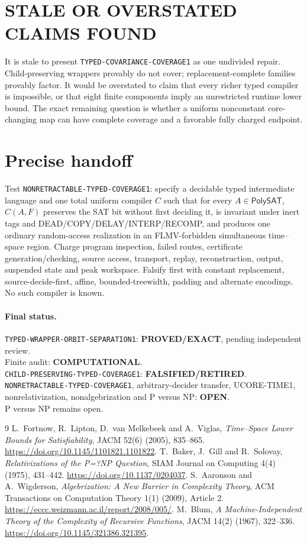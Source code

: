 \documentclass[11pt]{article}
\newcommand{\PolySAT}{\mathsf{PolySAT}}
\newcommand{\EXACT}{\textbf{PROVED/EXACT}}
\newcommand{\OPEN}{\textbf{OPEN}}
\newcommand{\RETIRED}{\textbf{FALSIFIED/RETIRED}}
\newcommand{\COMP}{\textbf{COMPUTATIONAL}}
\begin{document}
\section{STALE OR OVERSTATED CLAIMS FOUND}
It is stale to present \texttt{TYPED-COVARIANCE-COVERAGE1} as one undivided
repair.  Child-preserving wrappers provably do not cover; replacement-complete
families provably factor.  It would be overstated to claim that every richer
typed compiler is impossible, or that eight finite components imply an
unrestricted runtime lower bound.  The exact remaining question is whether a
uniform nonconstant core-changing map can have complete coverage and a
favorable fully charged endpoint.

\section{Precise handoff}
Test \texttt{NONRETRACTABLE-TYPED-COVERAGE1}: specify a decidable typed
intermediate language and one total uniform compiler \(C\) such that for
every \(A\in\PolySAT\), \(C(A,F)\) preserves the SAT bit without first
deciding it, is invariant under inert tags and DEAD/COPY/DELAY/INTERP/RECOMP,
and produces one ordinary random-access realization in an FLMV-forbidden
simultaneous time--space region.  Charge program inspection, failed routes,
certificate generation/checking, source access, transport, replay,
reconstruction, output, suspended state and peak workspace.  Falsify first
with constant replacement, source-decide-first, affine, bounded-treewidth,
padding and alternate encodings.  No such compiler is known.

\paragraph{Final status.}
\texttt{TYPED-WRAPPER-ORBIT-SEPARATION1}: \EXACT, pending independent review.\\
Finite audit: \COMP.\\
\texttt{CHILD-PRESERVING-TYPED-COVERAGE1}: \RETIRED.\\
\texttt{NONRETRACTABLE-TYPED-COVERAGE1}, arbitrary-decider transfer,
UCORE-TIME1, nonrelativization, nonalgebrization and P versus NP: \OPEN.\\
P versus NP remains open.

\begin{thebibliography}{9}
 L.~Fortnow, R.~Lipton, D.~van Melkebeek and A.~Viglas,
\emph{Time--Space Lower Bounds for Satisfiability}, JACM 52(6) (2005),
835--865. \url{https://doi.org/10.1145/1101821.1101822}.
 T.~Baker, J.~Gill and R.~Solovay,
\emph{Relativizations of the P=?NP Question}, SIAM Journal on Computing
4(4) (1975), 431--442. \url{https://doi.org/10.1137/0204037}.
 S.~Aaronson and A.~Wigderson,
\emph{Algebrization: A New Barrier in Complexity Theory}, ACM Transactions
on Computation Theory 1(1) (2009), Article 2.
\url{https://eccc.weizmann.ac.il/report/2008/005/}.
 M.~Blum,
\emph{A Machine-Independent Theory of the Complexity of Recursive Functions},
JACM 14(2) (1967), 322--336.
\url{https://doi.org/10.1145/321386.321395}.
\end{thebibliography}

\end{document}
